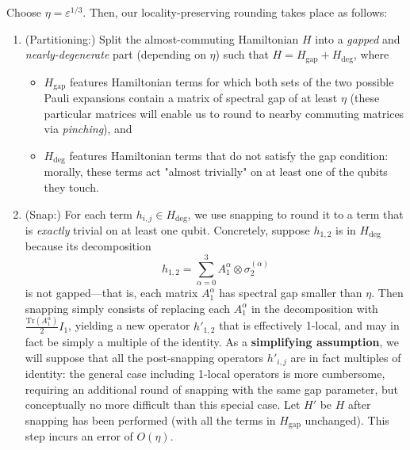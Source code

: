 \documentclass[a4paper,onecolumn,11pt]{quantumarticle}
\theoremstyle{plain}
\newcommand{\gap}{\mathrm{gap}}
\renewcommand{\deg}{\mathrm{deg}}
\newcommand{\eps}{\varepsilon}
\begin{document}
Choose $\eta =\eps^{1/3}$. Then, our locality-preserving rounding takes place as follows:
\begin{enumerate}
    \item (Partitioning:) Split the almost-commuting Hamiltonian $H$ into a \emph{gapped} and \emph{nearly-degenerate} part (depending on $\eta$) such that $H= H_{\gap} + H_{\deg}$, where
    \begin{itemize}
        \item $H_{\gap}$ features Hamiltonian terms for which both sets of the two possible Pauli expansions contain a matrix of spectral gap of at least $\eta$ (these particular matrices will enable us to round to nearby commuting matrices via \emph{pinching}), and

        \item $H_{\deg}$ features Hamiltonian terms that do not satisfy the gap condition: morally, these terms act "almost trivially" on at least one of the qubits they touch. 
    \end{itemize}
    \item (Snap:) For each term $h_{i,j} \in H_{\deg}$, we use snapping to round it to a term that is \emph{exactly} trivial on at least one qubit. Concretely, suppose $h_{1,2}$ is in $H_{\deg}$ because its decomposition
    \[ h_{1,2} = \sum_{\alpha=0}^{3} A_1^\alpha \otimes \sigma_2^{(\alpha)}\]
    is not gapped---that is, each matrix $A_1^\alpha$ has spectral gap smaller than $\eta$. Then snapping simply consists of replacing each $A_1^\alpha$ in the decomposition with $\frac{\mathrm{Tr}(A_1^\alpha)}{2}I_1$, yielding a new operator $h'_{1,2}$ that is effectively 1-local, and may in fact be simply a multiple of the identity. As a \textbf{simplifying assumption}, we will suppose that all the post-snapping operators $h'_{i,j}$ are in fact multiples of identity: the general case including 1-local operators is more cumbersome, requiring an additional round of snapping with the same gap parameter, but conceptually no more difficult than this special case. Let $H'$ be $H$ after snapping has been performed (with all the terms in $H_{\gap}$ unchanged). This step incurs an error of $O(\eta)$.


\end{enumerate}
\end{document}
